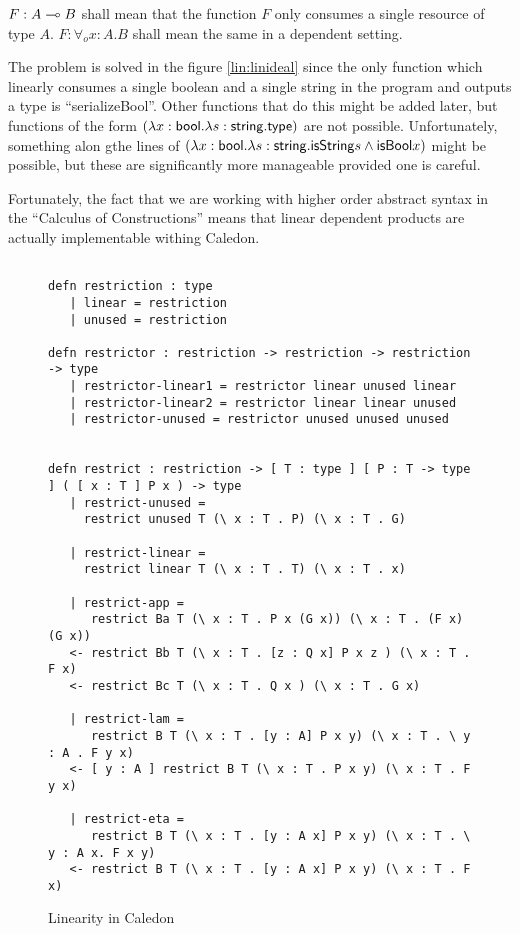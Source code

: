 $F : A \multimap B$ shall mean that the function $F$ only consumes a single resource of type $A$.  
$F : \forall_o x : A . B$ shall mean the same in a dependent setting.


The problem is solved in the figure \ref{lin:linideal} since the only function which linearly 
consumes a single boolean and a single string in the program and outputs a type is ``serializeBool''.  
Other functions that do this might be added later, but functions of the form 
$(\lambda x : \mathsf{bool}. \lambda s : \mathsf{string} . \mathsf{type})$ are not possible.  
Unfortunately, something alon gthe lines of 
$(\lambda x : \mathsf{bool}. \lambda s : \mathsf{string} . \mathsf{isString} s \wedge \mathsf{isBool} x)$ might be possible, 
but these are significantly more manageable provided one is careful.  

Fortunately, the fact that we are working with higher order abstract syntax in the ``Calculus of Constructions''
means that linear dependent products are actually implementable withing Caledon.


\begin{figure}[H]
\begin{lstlisting}

defn restriction : type
   | linear = restriction
   | unused = restriction

defn restrictor : restriction -> restriction -> restriction -> type
   | restrictor-linear1 = restrictor linear unused linear
   | restrictor-linear2 = restrictor linear linear unused 
   | restrictor-unused = restrictor unused unused unused


defn restrict : restriction -> [ T : type ] [ P : T -> type ] ( [ x : T ] P x ) -> type
   | restrict-unused = 
     restrict unused T (\ x : T . P) (\ x : T . G)

   | restrict-linear = 
     restrict linear T (\ x : T . T) (\ x : T . x)

   | restrict-app = 
      restrict Ba T (\ x : T . P x (G x)) (\ x : T . (F x) (G x))
   <- restrict Bb T (\ x : T . [z : Q x] P x z ) (\ x : T . F x)
   <- restrict Bc T (\ x : T . Q x ) (\ x : T . G x)

   | restrict-lam = 
      restrict B T (\ x : T . [y : A] P x y) (\ x : T . \ y : A . F y x)
   <- [ y : A ] restrict B T (\ x : T . P x y) (\ x : T . F y x)

   | restrict-eta = 
      restrict B T (\ x : T . [y : A x] P x y) (\ x : T . \ y : A x. F x y)
   <- restrict B T (\ x : T . [y : A x] P x y) (\ x : T . F x)

\end{lstlisting}
\caption{Linearity in Caledon}
\label{lin:linimp}
\end{figure}



